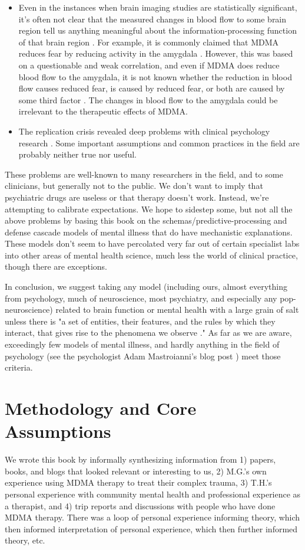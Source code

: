 \documentclass[12pt,letterpaper]{book}
\begin{document}
\begin{itemize}
    \item Even in the instances when brain imaging studies are statistically significant, it's often not clear that the measured changes in blood flow to some brain region tell us anything meaningful about the information-processing function of that brain region \cite{jonas2017microprocessor,dewit2016neuroimaging,alikoEntireBrain}. For example, it is commonly claimed that MDMA reduces fear by reducing activity in the amygdala \cite{fedduciaMDMAMemoryReconsolidation}. However, this was based on a questionable and weak correlation, and even if MDMA does reduce blood flow to the amygdala, it is not known whether the reduction in blood flow causes reduced fear, is caused by reduced fear, or both are caused by some third factor \cite{mdmaNeuroimaging}. The changes in blood flow to the amygdala could be irrelevant to the therapeutic effects of MDMA.
    \item The replication crisis revealed deep problems with clinical psychology research \cite{therapyReplicationCrisis}. Some important assumptions and common practices in the field are probably neither true nor useful.
\end{itemize}
These problems are well-known to many researchers in the field, and to some clinicians, but generally not to the public. We don't want to imply that psychiatric drugs are useless or that therapy doesn't work. Instead, we're attempting to calibrate expectations. We hope to sidestep some, but not all the above problems by basing this book on the schemas/predictive-processing and defense cascade models of mental illness that do have mechanistic explanations. These models don't seem to have percolated very far out of certain specialist labs into other areas of mental health science, much less the world of clinical practice, though there are exceptions.

In conclusion, we suggest taking any model (including ours, almost everything from psychology, much of neuroscience, most psychiatry, and especially any pop-neuroscience) related to brain function or mental health with a large grain of salt unless there is "a set of entities, their features, and the rules by which they interact, that gives rise to the phenomena we observe \cite{mechanisticModels}." As far as we are aware, exceedingly few models of mental illness, and hardly anything in the field of psychology (see the psychologist Adam Mastroianni's blog post \textcite{MastroianniPsychology}) meet those criteria.
\section{Methodology and Core Assumptions}
\label{sec:assumptions}
We wrote this book by informally synthesizing information from 1) papers, books, and blogs that looked relevant or interesting to us, 2) M.G.'s own experience using MDMA therapy to treat their complex trauma, 3) T.H.'s personal experience with community mental health and professional experience as a therapist, and 4) trip reports and discussions with people who have done MDMA therapy. There was a loop of personal experience informing theory, which then informed interpretation of personal experience, which then further informed theory, etc.
\end{document}

